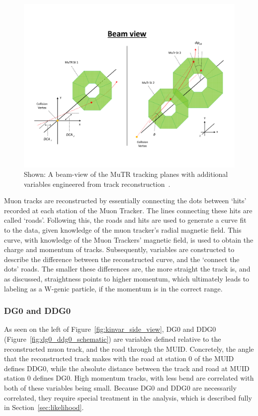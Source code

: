 \begin{figure}[ht]
  \centering
  \includegraphics[width=\textwidth]{./figures/kinvar_beam_view.pdf}
  \caption{
    Shown: A beam-view of the MuTR tracking planes with additional variables
    engineered from track reconstruction~\cite{Kim2016}.
  }
  \label{fig:kinvar_beam_view}
\end{figure}

Muon tracks are reconstructed by essentially connecting the dots between `hits'
recorded at each station of the Muon Tracker.  The lines connecting these hits
are called `roads'.  Following this, the roads and hits are used to generate a
curve fit to the data, given knowledge of the muon tracker's radial magnetic
field. This curve, with knowledge of the Muon Trackers' magnetic field, is used
to obtain the charge and momentum of tracks.  Subsequently, variables are
constructed to describe the difference between the reconstructed curve, and the
`connect the dots' roads.  The smaller these differences are, the more straight
the track is, and as discussed, straightness points to higher momentum, which
ultimately leads to labeling as a W-genic particle, if the momentum is in the
correct range.

\subsubsection{DG0 and DDG0}

As seen on the left of Figure~\ref{fig:kinvar_side_view}, DG0 and DDG0
(Figure~\ref{fig:dg0_ddg0_schematic}) are variables defined relative to the
reconstructed muon track, and the road through the MUID. Concretely, the angle
that the reconstructed track makes with the road at station 0 of the MUID
defines DDG0, while the absolute distance between the track and road at MUID
station 0 defines DG0. High momentum tracks, with less bend are correlated with
both of these variables being small. Because DG0 and DDG0 are necessarily
correlated, they require special treatment in the analysis, which is described
fully in Section~\ref{sec:likelihood}.

